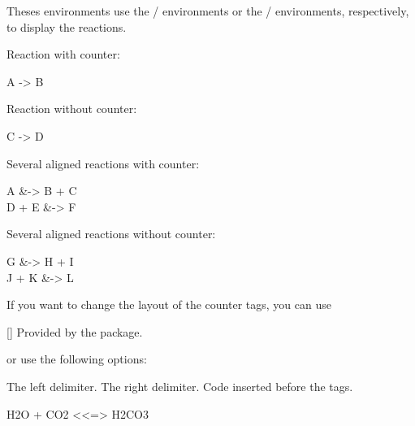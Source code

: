 \documentclass{chemmacros-manual}
\begin{document}
Theses environments use the / environments or
the / environments, respectively, to display the
reactions.

\begin{example}
  Reaction with counter:
  \begin{reaction}
    A -> B
  \end{reaction}
\end{example}

\begin{example}
  Reaction without counter:
  \begin{reaction*}
    C -> D
  \end{reaction*}
\end{example}

\begin{example}
  Several aligned reactions with counter:
  \begin{reactions}
    A     &-> B + C \\
    D + E &-> F
  \end{reactions}
\end{example}

\begin{example}
  Several aligned reactions without counter:
  \begin{reactions*}
    G     &-> H + I \\
    J + K &-> L
  \end{reactions*}
\end{example}

If you want to change the layout of the counter tags, you can use
\begin{commands}
  []
    Provided by the  package.
\end{commands}
or use the following options:
\begin{options}
  \Default{\{}
    The left delimiter.
  \Default{\}}
    The right delimiter.
  \Default
    Code inserted before the tags.
\end{options}

\begin{example}
  \begin{reaction}
    H2O + CO2 <<=> H2CO3
  \end{reaction}
\end{example}
\end{document}
